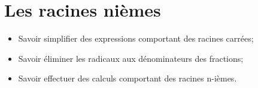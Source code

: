 \chapter{Les racines nièmes}\label{ChLesRacines}

\begin{acquis}
\begin{itemize}
\item Savoir simplifier des expressions comportant des racines carrées;
\item Savoir éliminer les radicaux aux dénominateurs des fractions;
\item Savoir effectuer des calculs comportant des racines n-ièmes.
\end{itemize}
\end{acquis}



\exercicesbase
\begin{colonne*exercice}

\end{colonne*exercice}




\connaissances




\pagebreak



